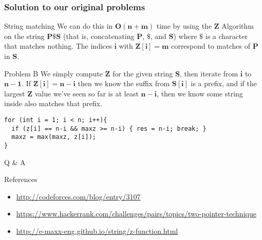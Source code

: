 \documentclass{beamer}
\begin{document}
\begin{frame}[fragile]
\frametitle{Solution to our original problems}
\begin{block}{String matching}
We can do this in $\mathbf{O(n + m)}$ time by using the $\mathbf{Z}$ Algorithm on the string $\mathbf{P \$ S}$ (that is, concatenating $\mathbf{P}$, $\mathbf{\$}$, and $\mathbf{S}$) where $\mathbf{\$}$ is a character that matches nothing. The indices $\mathbf{i}$ with $\mathbf{Z[i] = m}$ correspond to matches of $\mathbf{P}$ in $\mathbf{S}$.
\end{block}

\begin{block}{Problem B}
We simply compute $\mathbf{Z}$ for the given string $\mathbf{S}$, then iterate from $\mathbf{i}$ to $\mathbf{n-1}$. If $\mathbf{Z[i] = n - i}$ then we know the suffix from $\mathbf{S[i]}$ is a prefix, and if the largest $\mathbf{Z}$ value we've seen so far is at least $\mathbf{n - i}$, then we know some string inside also matches that prefix.
\begin{lstlisting}
for (int i = 1; i < n; i++){
  if (z[i] == n-i && maxz >= n-i) { res = n-i; break; }
  maxz = max(maxz, z[i]);
}
\end{lstlisting}
\end{block}

\end{frame}
\begin{frame}
\Huge{\centerline{ Q \& A }}

\normalsize
{
\begin{block}{References}
\begin{itemize}
\item \url{http://codeforces.com/blog/entry/3107}
\item \url{https://www.hackerrank.com/challenges/pairs/topics/two-pointer-technique}
\item \url{http://e-maxx-eng.github.io/string/z-function.html}
\end{itemize}
\end{block}
}
\end{frame}
\end{document}
